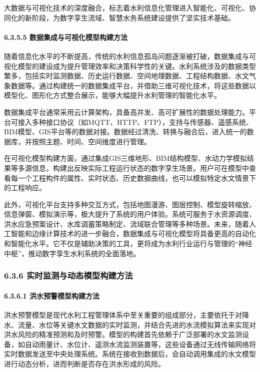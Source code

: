 大数据与可视化技术的深度融合，标志着水利信息化管理进入智能化、可视化、协同化的新阶段，为数字孪生流域、智慧水务系统建设提供了坚实技术基础。

\paragraph{6.3.5.5 数据集成与可视化模型构建方法}\label{ux6570ux636eux96c6ux6210ux4e0eux53efux89c6ux5316ux6a21ux578bux6784ux5efaux65b9ux6cd5-1}

随着信息化水平的不断提高，传统的水利信息孤岛问题逐渐被打破，数据集成与可视化模型的建设成为提升管理效率和决策科学性的关键。水利系统涉及的数据类型繁多，包括实时监测数据、历史运行数据、空间地理数据、工程结构数据、水文气象数据等。通过构建统一的数据集成平台，并借助三维可视化技术，将这些数据以模型化、图形化方式整合展示，能够大幅提升水利管理的智能化水平。

数据集成平台通常采用云计算架构，具备高并发、高可扩展性的数据处理能力。平台可接入多种接口协议（如MQTT、HTTP、FTP），支持与传感器、遥感系统、BIM模型、GIS平台等的数据对接。数据经过清洗、转换与融合后，进入统一的数据库，并按照主题、时间、空间维度进行管理。

在可视化模型构建方面，通过集成GIS三维地形、BIM结构模型、水动力学模拟结果等多源信息，构建出反映实际工程运行状态的数字孪生场景。用户可在模型中查看每一个工程构件的属性、实时状态、历史数据曲线，也可以模拟特定水文情景下的工程响应。

此外，可视化平台支持多种交互方式，包括地图漫游、图层控制、模型旋转缩放、信息弹窗、模拟演示等，极大提升了系统的用户体验。系统可服务于水资源调度、洪水应急预案设计、水库调蓄策略制定、流域联合管理等多种场景。未来，随着人工智能和边缘计算技术的进一步融合，数据集成与可视化模型将具备更高的自动化和智能化水平。它不仅是辅助决策的工具，更将成为水利行业运行与管理的``神经中枢''，推动数字孪生水利系统的全面落地。

\subsubsection{6.3.6 实时监测与动态模型构建方法}\label{ux5b9eux65f6ux76d1ux6d4bux4e0eux52a8ux6001ux6a21ux578bux6784ux5efaux65b9ux6cd5}

\paragraph{6.3.6.1 洪水预警模型构建方法}\label{ux6d2aux6c34ux9884ux8b66ux6a21ux578bux6784ux5efaux65b9ux6cd5}

洪水预警模型是现代水利工程管理体系中至关重要的组成部分，主要依托于对降水、流量、水位等关键水文数据的实时监测，并结合先进的水流模拟算法来实现对洪水风险的精准预测和及时预警。模型的构建首先依赖于广泛部署的水文监测设备，如自动雨量计、水位计、遥测水流监测装置等，这些设备通过无线传输网络将实时数据发送至中央处理系统。系统在接收到数据后，会自动调用集成的水文模型进行动态分析，进而判断是否存在洪水形成的风险。

